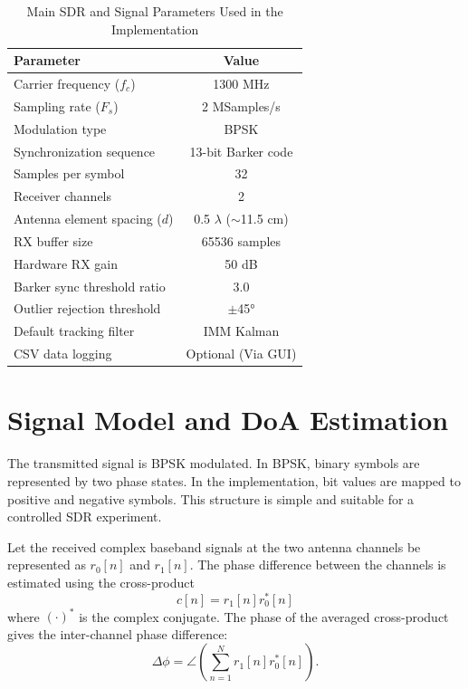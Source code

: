 \documentclass[conference]{IEEEtran}
\begin{document}
\begin{table}[htbp]
\caption{Main SDR and Signal Parameters Used in the Implementation}
\label{tab:sdr_params}
\centering
\begin{tabular}{lc}
\hline
\textbf{Parameter} & \textbf{Value} \\ \hline
Carrier frequency ($f_c$) & 1300 MHz \\
Sampling rate ($F_s$) & 2 MSamples/s \\
Modulation type & BPSK \\
Synchronization sequence & 13-bit Barker code \\
Samples per symbol & 32 \\
Receiver channels & 2 \\
Antenna element spacing ($d$) & 0.5 $\lambda$ ($\sim$11.5 cm) \\
RX buffer size & 65536 samples \\
Hardware RX gain & 50 dB \\
Barker sync threshold ratio & 3.0 \\
Outlier rejection threshold & $\pm$45° \\
Default tracking filter & IMM Kalman \\
CSV data logging & Optional (Via GUI) \\ \hline
\end{tabular}
\end{table}

\section{Signal Model and DoA Estimation}

The transmitted signal is BPSK modulated. In BPSK, binary symbols are represented by two phase states. In the implementation, bit values are mapped to positive and negative symbols. This structure is simple and suitable for a controlled SDR experiment.

Let the received complex baseband signals at the two antenna channels be represented as $r_0[n]$ and $r_1[n]$. The phase difference between the channels is estimated using the cross-product \cite{Zhou2024RealTime}
\begin{equation}
    c[n] = r_1[n]r_0^*[n]
\end{equation}
where $(\cdot)^*$ is the complex conjugate. The phase of the averaged cross-product gives the inter-channel phase difference:
\begin{equation}
    \Delta \phi = \angle \left( \sum_{n=1}^{N} r_1[n]r_0^*[n] \right).
\end{equation}
\end{document}
